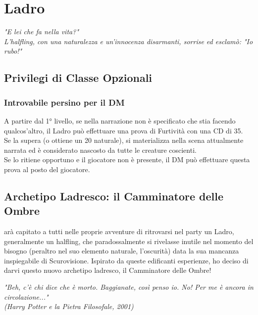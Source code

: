 \chapter{Ladro}

\begin{DndReadAloud}
  \it
  "E lei che fa nella vita?" \\ L'halfling, con una naturalezza e un'innocenza disarmanti, sorrise ed esclamò: "Io rubo!"
\end{DndReadAloud}

\section{Privilegi di Classe Opzionali}

\subsection{Introvabile persino per il DM}

A partire dal 1° livello, se nella narrazione non è specificato che stia facendo qualcos'altro, il Ladro può effettuare una prova di Furtività con una CD di 35. \\ Se la supera (o ottiene un 20 naturale), si materializza nella scena attualmente narrata ed è considerato nascosto da tutte le creature coscienti. \\ Se lo ritiene opportuno e il giocatore non è presente, il DM può effettuare questa prova al posto del giocatore.

\section{Archetipo Ladresco: il Camminatore delle Ombre}

arà capitato a tutti nelle proprie avventure di ritrovarsi nel party un Ladro, generalmente un halfling, che paradossalmente si rivelasse inutile nel momento del bisogno (peraltro nel suo elemento naturale, l'oscurità) data la sua mancanza inspiegabile di Scurovisione. Ispirato da queste edificanti esperienze, ho deciso di darvi questo nuovo archetipo ladresco, il Camminatore delle Ombre!

\begin{DndReadAloud}
  \it
  "Beh, c'è chi dice che è morto. Baggianate, così penso io. No! Per me è ancora in circolazione..." \\ (Harry Potter e la Pietra Filosofale, 2001)
\end{DndReadAloud}

